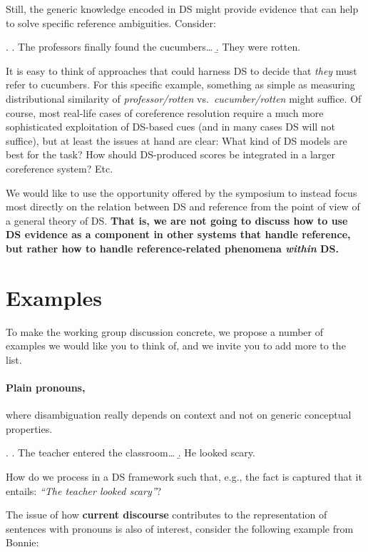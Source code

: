 \documentclass[a4paper,12pt]{article}
\begin{document}
Still, the generic knowledge encoded in DS might provide evidence that
can help to solve specific reference ambiguities. Consider:

\ex. \a. The professors finally found the cucumbers\ldots
\b. They were rotten.

It is easy to think of approaches that could harness DS to decide that
\emph{they} must refer to cucumbers. For this specific example,
something as simple as measuring distributional similarity of
\emph{professor/rotten} vs.~\emph{cucumber/rotten} might suffice. Of
course, most real-life cases of coreference resolution require a much
more sophisticated exploitation of DS-based cues (and in many cases DS
will not suffice), but at least the issues at hand are clear: What
kind of DS models are best for the task? How should DS-produced scores
be integrated in a larger coreference system? Etc.

We would like to use the opportunity offered by the symposium to
instead focus most directly on the relation between DS and reference
from the point of view of a general theory of DS. \textbf{That is, we are not
going to discuss how to use DS evidence as a component in other
systems that handle reference, but rather how to handle
reference-related phenomena \emph{within} DS.}

\section{Examples}
\label{sec:examples}

To make the working group discussion concrete, we propose a number of
examples we would like you to think of, and we invite you to add more
to the list.

\paragraph{Plain pronouns,} where disambiguation really depends on
context and not on generic conceptual properties.

\ex. \a. The teacher entered the classroom\ldots 
\b. He looked scary.

How do we process \Last[b] in a DS framework such that,
e.g.,  the
fact is
captured that it entails: \emph{``The teacher looked
  scary''}?

The issue of how \textbf{current discourse} contributes to the
representation of sentences with pronouns is also of interest,
consider the following example from Bonnie:
\end{document}
